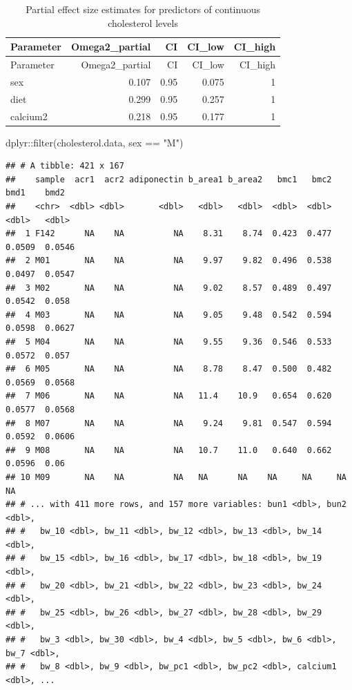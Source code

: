 \documentclass[
]{article}
\newenvironment{Shaded}{\begin{snugshade}}{\end{snugshade}}
\newcommand{\FunctionTok}[1]{\textcolor[rgb]{0.00,0.00,0.00}{#1}}
\newcommand{\NormalTok}[1]{#1}
\newcommand{\SpecialCharTok}[1]{\textcolor[rgb]{0.00,0.00,0.00}{#1}}
\newcommand{\StringTok}[1]{\textcolor[rgb]{0.31,0.60,0.02}{#1}}
\begin{document}
\begin{longtable}[]{@{}lrrrr@{}}
\caption{Partial effect size estimates for predictors of continuous
cholesterol levels}\tabularnewline
\toprule()
Parameter & Omega2\_partial & CI & CI\_low & CI\_high \\
\midrule()
\endfirsthead
\toprule()
Parameter & Omega2\_partial & CI & CI\_low & CI\_high \\
\midrule()
\endhead
sex & 0.107 & 0.95 & 0.075 & 1 \\
diet & 0.299 & 0.95 & 0.257 & 1 \\
calcium2 & 0.218 & 0.95 & 0.177 & 1 \\
\bottomrule()
\end{longtable}

\begin{Shaded}
\begin{Highlighting}[]
\NormalTok{dplyr}\SpecialCharTok{::}\FunctionTok{filter}\NormalTok{(cholesterol.data, sex }\SpecialCharTok{==} \StringTok{"M"}\NormalTok{)}
\end{Highlighting}
\end{Shaded}

\begin{verbatim}
## # A tibble: 421 x 167
##    sample  acr1  acr2 adiponectin b_area1 b_area2   bmc1   bmc2    bmd1    bmd2
##    <chr>  <dbl> <dbl>       <dbl>   <dbl>   <dbl>  <dbl>  <dbl>   <dbl>   <dbl>
##  1 F142      NA    NA          NA    8.31    8.74  0.423  0.477  0.0509  0.0546
##  2 M01       NA    NA          NA    9.97    9.82  0.496  0.538  0.0497  0.0547
##  3 M02       NA    NA          NA    9.02    8.57  0.489  0.497  0.0542  0.058 
##  4 M03       NA    NA          NA    9.05    9.48  0.542  0.594  0.0598  0.0627
##  5 M04       NA    NA          NA    9.55    9.36  0.546  0.533  0.0572  0.057 
##  6 M05       NA    NA          NA    8.78    8.47  0.500  0.482  0.0569  0.0568
##  7 M06       NA    NA          NA   11.4    10.9   0.654  0.620  0.0577  0.0568
##  8 M07       NA    NA          NA    9.24    9.81  0.547  0.594  0.0592  0.0606
##  9 M08       NA    NA          NA   10.7    11.0   0.640  0.662  0.0596  0.06  
## 10 M09       NA    NA          NA   NA      NA    NA     NA     NA      NA     
## # ... with 411 more rows, and 157 more variables: bun1 <dbl>, bun2 <dbl>,
## #   bw_10 <dbl>, bw_11 <dbl>, bw_12 <dbl>, bw_13 <dbl>, bw_14 <dbl>,
## #   bw_15 <dbl>, bw_16 <dbl>, bw_17 <dbl>, bw_18 <dbl>, bw_19 <dbl>,
## #   bw_20 <dbl>, bw_21 <dbl>, bw_22 <dbl>, bw_23 <dbl>, bw_24 <dbl>,
## #   bw_25 <dbl>, bw_26 <dbl>, bw_27 <dbl>, bw_28 <dbl>, bw_29 <dbl>,
## #   bw_3 <dbl>, bw_30 <dbl>, bw_4 <dbl>, bw_5 <dbl>, bw_6 <dbl>, bw_7 <dbl>,
## #   bw_8 <dbl>, bw_9 <dbl>, bw_pc1 <dbl>, bw_pc2 <dbl>, calcium1 <dbl>, ...
\end{verbatim}
\end{document}
